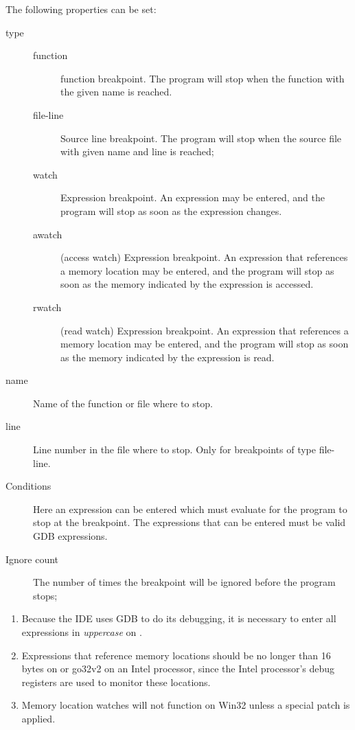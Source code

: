 The following properties can be set:
\begin{description}
\item[type]
\begin{description}
\item[function] function breakpoint. The program will stop when the function
with the given name is reached.
\item[file-line] Source line breakpoint. The program will stop when the
source file with given name and line is reached;
\item[watch] Expression breakpoint. An expression may be entered, and the
program will stop as soon as the expression changes.
\item[awatch] (access watch) Expression breakpoint. An expression that references a
memory location may be entered, and the program will stop as soon as
the memory indicated by the expression is accessed.
\item[rwatch] (read watch) Expression breakpoint. An expression that references a
memory location may be entered, and the program will stop as soon as
the memory indicated by the expression is read.
\end{description}
\item[name] Name of the function or file where to stop.
\item[line] Line number in the file where to stop. Only for breakpoints of
type file-line.
\item[Conditions] Here an expression can be entered which must evaluate
 for the program to stop at the breakpoint. The expressions that
can be entered must be valid GDB expressions.
\item[Ignore count] The number of times the breakpoint will be ignored
before the program stops;
\end{description}
\begin{remark}
\begin{enumerate}
\item Because the IDE uses GDB to do its debugging, it is necessary to enter all
expressions in {\em uppercase} on \freebsd.
\item Expressions that reference memory locations should be no longer than 16
bytes on \linux or go32v2 on an Intel processor, since the Intel processor's
debug registers are used to monitor these locations.
\item Memory location watches will not function on Win32 unless a special
patch is applied.
\end{enumerate}
\end{remark}

